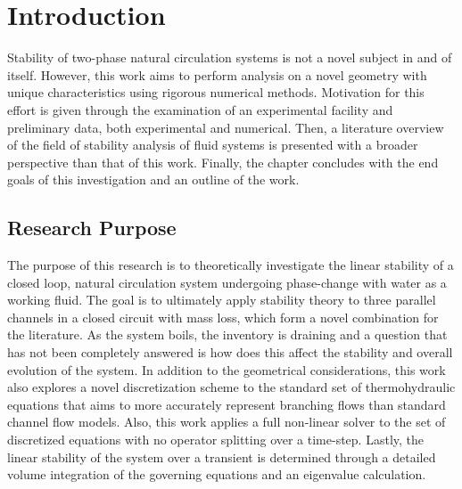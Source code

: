 \documentclass[12pt]{../UWMadThesis}
\begin{document}
\chapter{Introduction}

Stability of two-phase natural circulation systems is not a novel subject in and of itself.
However, this work aims to perform analysis on a novel geometry with unique characteristics using rigorous numerical methods.
Motivation for this effort is given through the examination of an experimental facility and preliminary data, both experimental and numerical.
Then, a literature overview of the field of stability analysis of fluid systems is presented with a broader perspective than that of this work.
Finally, the chapter concludes with the end goals of this investigation and an outline of the work.

\iffalse
 

\newpage



\section{Research Purpose}\label{Section:Purpose}

The purpose of this research is to theoretically investigate the linear stability of a closed loop, natural circulation system undergoing phase-change with water as a working fluid.
The goal is to ultimately apply stability theory to three parallel channels in a closed circuit with mass loss, which form a novel combination for the literature.
As the system boils, the inventory is draining and a question that has not been completely answered is how does this affect the stability and overall evolution of the system.
In addition to the geometrical considerations, this work also explores a novel discretization scheme to the standard set of thermohydraulic equations that aims to more accurately represent branching flows than standard channel flow models.
Also, this work applies a full non-linear solver to the set of discretized equations with no operator splitting over a time-step.
Lastly, the linear stability of the system over a transient is determined through a detailed volume integration of the governing equations and an eigenvalue calculation.
\end{document}
